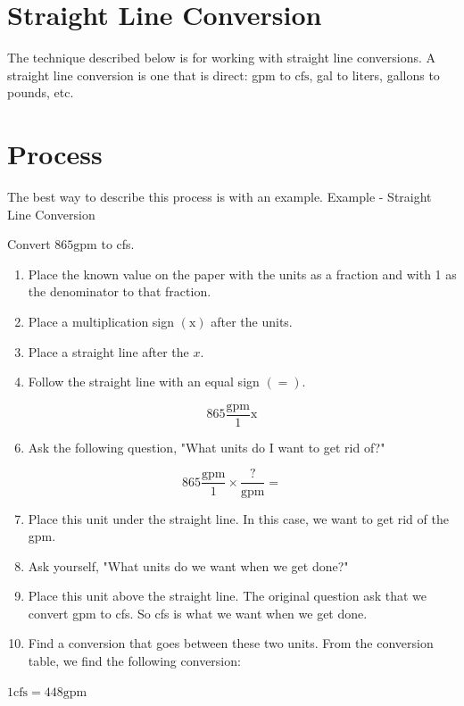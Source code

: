 \documentclass[10pt]{article}
\begin{document}
\section{Straight Line Conversion}
The technique described below is for working with straight line conversions. A straight line conversion is one that is direct: gpm to $\mathrm{cfs}$, gal to liters, gallons to pounds, etc.

\section{Process}
The best way to describe this process is with an example. Example - Straight Line Conversion

Convert $865 \mathrm{gpm}$ to cfs.

\begin{enumerate}
  \item Place the known value on the paper with the units as a fraction and with 1 as the denominator to that fraction.

  \item Place a multiplication sign $(\mathrm{x})$ after the units.

  \item Place a straight line after the $x$.

  \item Follow the straight line with an equal sign $(=)$.

\end{enumerate}
$$
865 \frac{\mathrm{gpm}}{1} \mathrm{x}
$$

\begin{enumerate}
  \setcounter{enumi}{5}
  \item Ask the following question, "What units do I want to get rid of?"
\end{enumerate}
$$
865 \frac{\mathrm{gpm}}{1} \times \frac{?}{\mathrm{gpm}}=
$$

\begin{enumerate}
  \setcounter{enumi}{6}
  \item Place this unit under the straight line. In this case, we want to get rid of the gpm.

  \item Ask yourself, "What units do we want when we get done?"

  \item Place this unit above the straight line. The original question ask that we convert gpm to cfs. So cfs is what we want when we get done.

  \item Find a conversion that goes between these two units. From the conversion table, we find the following conversion:

\end{enumerate}
$1 \mathrm{cfs}=448 \mathrm{gpm}$
\end{document}
